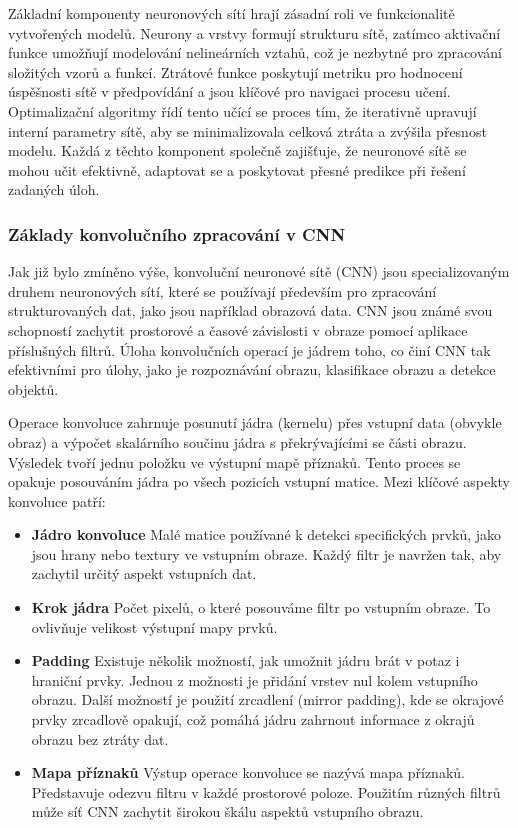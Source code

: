 \documentclass[male,czech,api_ing]{thesis}
\begin{document}
Základní komponenty neuronových sítí hrají zásadní roli ve funkcionalitě vytvořených modelů. Neurony a vrstvy formují strukturu sítě, zatímco aktivační funkce umožňují modelování nelineárních vztahů, což je nezbytné pro zpracování složitých vzorů a funkcí. Ztrátové funkce poskytují metriku pro hodnocení úspěšnosti sítě v předpovídání a jsou klíčové pro navigaci procesu učení. Optimalizační algoritmy řídí tento učící se proces tím, že iterativně upravují interní parametry sítě, aby se minimalizovala celková ztráta a zvýšila přesnost modelu. Každá z těchto komponent společně zajišťuje, že neuronové sítě se mohou učit efektivně, adaptovat se a poskytovat přesné predikce při řešení zadaných úloh. \cite{CNNConcepts, CNNConcepts2}

\subsubsection{Základy konvolučního zpracování v CNN}
Jak již bylo zmíněno výše, konvoluční neuronové sítě (CNN) jsou specializovaným druhem neuronových sítí, které se používají především pro zpracování strukturovaných dat, jako jsou například obrazová data. CNN jsou známé svou schopností zachytit prostorové a časové závislosti v obraze pomocí aplikace příslušných filtrů. Úloha konvolučních operací je jádrem toho, co činí CNN tak efektivními pro úlohy, jako je rozpoznávání obrazu, klasifikace obrazu a detekce objektů.

Operace konvoluce zahrnuje posunutí jádra (kernelu) přes vstupní data (obvykle obraz) a výpočet skalárního součinu jádra s překrývajícími se části obrazu. Výsledek tvoří jednu položku ve výstupní mapě příznaků. Tento proces se opakuje posouváním jádra po všech pozicích vstupní matice. Mezi klíčové aspekty konvoluce patří:

\begin{itemize}
    \item \textbf{Jádro konvoluce} Malé matice používané k detekci specifických prvků, jako jsou hrany nebo textury ve vstupním obraze. Každý filtr je navržen tak, aby zachytil určitý aspekt vstupních dat.
    \item \textbf{Krok jádra} Počet pixelů, o které posouváme filtr po vstupním obraze. To ovlivňuje velikost výstupní mapy prvků.
    \item \textbf{Padding} Existuje několik možností, jak umožnit jádru brát v potaz i hraniční prvky. Jednou z možnosti je přidání vrstev nul kolem vstupního obrazu. Další možností je použití zrcadlení (mirror padding), kde se okrajové prvky zrcadlově opakují, což pomáhá jádru zahrnout informace z okrajů obrazu bez ztráty dat.
    \item \textbf{Mapa příznaků} Výstup operace konvoluce se nazývá mapa příznaků. Představuje odezvu filtru v každé prostorové poloze. Použitím různých filtrů může síť CNN zachytit širokou škálu aspektů vstupního obrazu.
\end{itemize}
\end{document}
